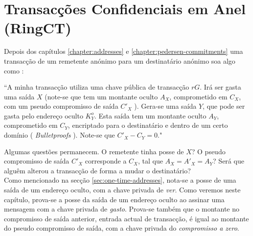 \chapter{Transacções Confidenciais em Anel (RingCT)}
\label{chapter:transactions}

Depois dos capítulos \ref{chapter:addresses} e \ref{chapter:pedersen-commitments} uma transacção de um remetente anónimo para um destinatário anónimo soa algo como :
 

``A minha transacção utiliza uma chave pública de transacção $r G$. Irá ser gasta uma saída $X$ (note-se que tem um montante oculto $A_X$, comprometido em $C_X$, com um pseudo compromisso de saída $C'_X$ ). Gera-se uma saída $Y$, que pode ser gasta pelo endereço oculto $K^o_Y$. Esta saída tem um montante oculto $A_Y$, comprometido em $C_Y$, encriptado para o destinatário e dentro de um certo domínio ( {\em Bulletproofs} ). Note-se que $C'_X - C_Y = 0$."
 

Algumas questões permanecem. O remetente tinha posse de $X$? O pseudo compromisso de saída $C'_X$ corresponde a $C_X$, tal que $A_X = A'_X = A_Y$? Será que alguêm alterou a transacção de forma a mudar o destinatário?  
\\
Como mencionado na secção \ref{sec:one-time-addresses}, nota-se a posse de uma saída de um endereço oculto, com a chave privada de {\em ver}. Como veremos neste capítulo, prova-se a posse da saída de um endereço oculto ao assinar uma mensagem com a chave privada de {\em gasto}. Prova-se também que o montante no compromisso de saída anterior, entrada actual de transacção, é igual ao montante do pseudo compromisso de saída, com a chave privada do {\em compromisso a zero}. 


